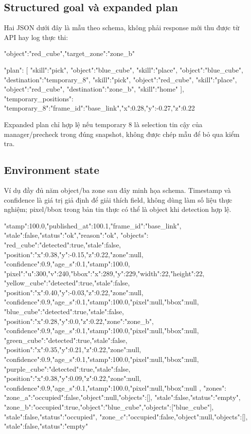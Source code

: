 \documentclass[12pt,a4paper]{article}
\begin{document}
\subsection{Structured goal và expanded plan}
Hai JSON dưới đây là mẫu theo schema, không phải response mới thu được từ API hay log thực thi:
\begin{Code}
{"object":"red_cube","target_zone":"zone_b"}

{
  "plan": [
    {"skill":"pick", "object":"blue_cube"},
    {"skill":"place", "object":"blue_cube", "destination":"temporary_8"},
    {"skill":"pick", "object":"red_cube"},
    {"skill":"place", "object":"red_cube", "destination":"zone_b"},
    {"skill":"home"}
  ],
  "temporary_positions": {
    "temporary_8":{"frame_id":"base_link","x":0.28,"y":-0.27,"z":0.22}
  }
}
\end{Code}
Expanded plan chỉ hợp lệ nếu temporary 8 là selection tin cậy của manager/precheck trong đúng snapshot, không được chép mẫu để bỏ qua kiểm tra.

\subsection{Environment state}
Ví dụ đầy đủ năm object/ba zone sau đây minh họa schema. Timestamp và confidence là giá trị giả định để giải thích field, không dùng làm số liệu thực nghiệm; pixel/bbox trong bản tin thực có thể là object khi detection hợp lệ.
\begin{Code}
{
 "stamp":100.0,"published_at":100.1,"frame_id":"base_link",
 "stale":false,"status":"ok","reason":"ok",
 "objects":{
  "red_cube":{"detected":true,"stale":false,
   "position":{"x":0.38,"y":-0.15,"z":0.22},"zone":null,
   "confidence":0.9,"age_s":0.1,"stamp":100.0,
   "pixel":{"u":300,"v":240},"bbox":{"x":289,"y":229,"width":22,"height":22}},
  "yellow_cube":{"detected":true,"stale":false,
   "position":{"x":0.40,"y":-0.03,"z":0.22},"zone":null,
   "confidence":0.9,"age_s":0.1,"stamp":100.0,"pixel":null,"bbox":null},
  "blue_cube":{"detected":true,"stale":false,
   "position":{"x":0.28,"y":0.0,"z":0.22},"zone":"zone_b",
   "confidence":0.9,"age_s":0.1,"stamp":100.0,"pixel":null,"bbox":null},
  "green_cube":{"detected":true,"stale":false,
   "position":{"x":0.35,"y":0.21,"z":0.22},"zone":null,
   "confidence":0.9,"age_s":0.1,"stamp":100.0,"pixel":null,"bbox":null},
  "purple_cube":{"detected":true,"stale":false,
   "position":{"x":0.38,"y":0.09,"z":0.22},"zone":null,
   "confidence":0.9,"age_s":0.1,"stamp":100.0,"pixel":null,"bbox":null}
 },
 "zones":{
  "zone_a":{"occupied":false,"object":null,"objects":[],
   "stale":false,"status":"empty"},
  "zone_b":{"occupied":true,"object":"blue_cube","objects":["blue_cube"],
   "stale":false,"status":"occupied"},
  "zone_c":{"occupied":false,"object":null,"objects":[],
   "stale":false,"status":"empty"}
 }
}
\end{Code}
\end{document}
